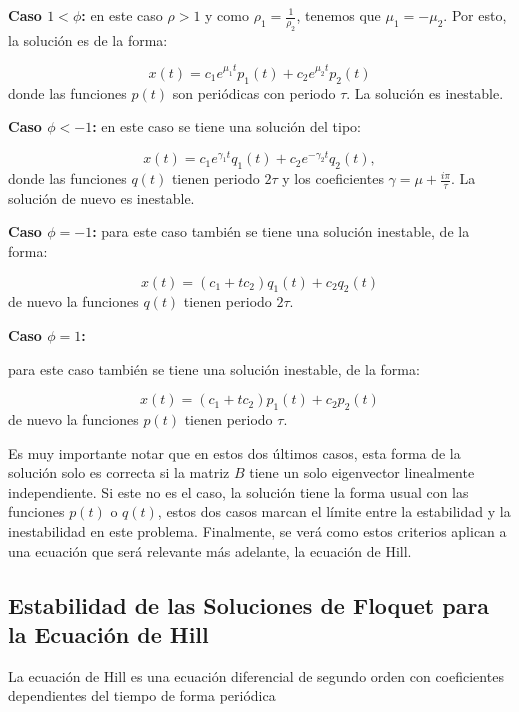 \documentclass[10pt,a4paper]{report}
\begin{document}
\textbf{Caso $1 < \phi$:} en este caso $\rho > 1$ y como $\rho_1 = \frac{1}{\rho_2}$, tenemos que $\mu_1 = -\mu_2$. Por esto, la solución es de la forma:

\begin{equation}
x(t) = c_1 e^{\mu_1 t}p_1(t) + c_2 e^{\mu_2 t}p_2(t)
\end{equation} donde las funciones $p(t)$ son periódicas con periodo $\tau$. 
La solución es inestable.

\textbf{Caso $\phi < -1$:} en este caso se tiene una solución del
tipo:

\begin{equation}
x(t) =c_1 e^{\gamma_1 t}q_1(t) + c_2 e^{-\gamma_2 t}q_2(t),
\end{equation} donde las funciones $q(t)$ tienen periodo $2\tau$ y los coeficientes $\gamma = \mu + \frac{i\pi}{\tau}$. La solución de nuevo es inestable.

\textbf{Caso $\phi = -1$:} para este caso también se tiene una
solución inestable, de la forma:

\begin{equation}
x(t) = (c_1 + tc_2)q_1(t) + c_2q_2(t)
\end{equation} de nuevo la funciones $q(t)$ tienen periodo $2\tau$.

\textbf{Caso $\phi = 1$:}

para este caso también se tiene una solución inestable, de la forma:

\begin{equation}
x(t) = (c_1 + tc_2)p_1(t) + c_2p_2(t)
\end{equation} de nuevo la funciones $p(t)$ tienen periodo $\tau$.

Es muy importante notar que en estos dos últimos casos, esta forma de la solución solo es correcta si la matriz $B$ tiene un solo eigenvector linealmente independiente. Si este no es el caso, la solución tiene la forma usual con las funciones $p(t)$ o $q(t)$, estos dos casos marcan el límite entre la estabilidad y la inestabilidad en este problema. Finalmente, se verá como estos criterios aplican a una ecuación que será relevante más adelante, la ecuación de Hill.

\subsection{Estabilidad de las Soluciones de Floquet para la Ecuación de Hill}

La ecuación de Hill es una ecuación diferencial de segundo orden con coeficientes dependientes del tiempo de forma periódica\cite{WardFT}
\end{document}
